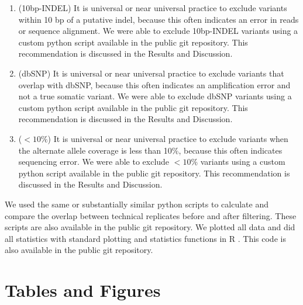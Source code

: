\documentclass[11pt]{article} %
\begin{document}
\begin{enumerate}
\item (10bp-INDEL) It is universal or near universal practice to exclude variants within 10 bp of a putative indel, because this often indicates an error in reads or sequence alignment. We were able to exclude 10bp-INDEL variants using a custom python script available in the public git repository. This recommendation is discussed in the Results and Discussion.
\item (dbSNP) It is universal or near universal practice to exclude variants that overlap with dbSNP, because this often indicates an amplification error and not a true somatic variant. We were able to exclude dbSNP variants using a custom python script available in the public git repository. This recommendation is discussed in the Results and Discussion.
\item ($<10\%$) It is universal or near universal practice to exclude variants when the alternate allele coverage is less than 10\%, because this often indicates sequencing error. We were able to exclude $<10\%$ variants using a custom python script available in the public git repository. This recommendation is discussed in the Results and Discussion.
\end{enumerate}

We used the same or substantially similar python scripts to calculate and compare the overlap between technical replicates before and after filtering. These scripts are also available in the public git repository. We plotted all data and did all statistics with standard plotting and statistics functions in R \cite{Rsoftware}. This code is also available in the public git repository.  

\section*{}




\section*{Tables and Figures}
\end{document}

